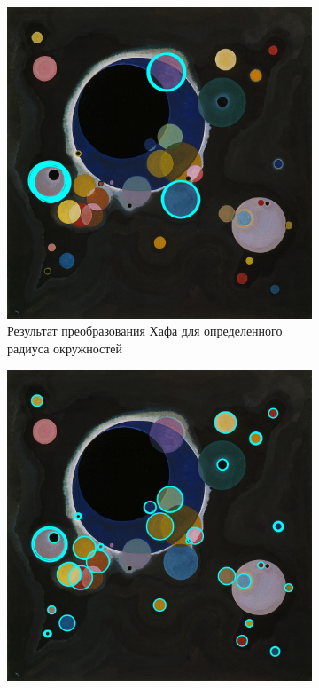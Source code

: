 \begin{figure}
    \centering
    \begin{subfigure}[b]{0.4\textwidth}
        \centering
        \includegraphics[width=\textwidth]{images/circles/Kandinsky_Several_Circles_SP.jpg}
        \caption{Результат преобразования Хафа для определенного радиуса окружностей}
        \label{img:kan_sp}
    \end{subfigure}
    \hfill
    \begin{subfigure}[b]{0.4\textwidth}
        \centering
        \includegraphics[width=\textwidth]{images/circles/Kandinsky_Several_Circles_R.jpg}

\end{subfigure}
\end{figure}
